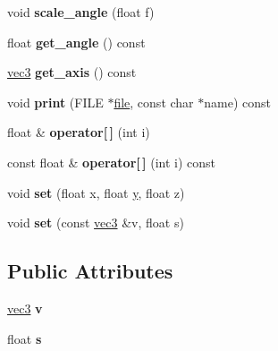 \begin{DoxyCompactItemize}
\item 
\hypertarget{classquat_a8861fff3cf3e4dbc76c472dd0605efd7}{void {\bfseries scale\+\_\+angle} (float f)}\label{classquat_a8861fff3cf3e4dbc76c472dd0605efd7}

\item 
\hypertarget{classquat_ad174ed3eb73c015ec1c64db57cafcfed}{float {\bfseries get\+\_\+angle} () const }\label{classquat_ad174ed3eb73c015ec1c64db57cafcfed}

\item 
\hypertarget{classquat_a4f4db727d50a5ab0c23b7ffeb7b4c57b}{\hyperlink{classvec3}{vec3} {\bfseries get\+\_\+axis} () const }\label{classquat_a4f4db727d50a5ab0c23b7ffeb7b4c57b}

\item 
\hypertarget{classquat_ac2dcca32b18337fa8e67f89b9b207108}{void {\bfseries print} (F\+I\+L\+E $\ast$\hyperlink{structfile}{file}, const char $\ast$name) const }\label{classquat_ac2dcca32b18337fa8e67f89b9b207108}

\item 
\hypertarget{classquat_acea2496f35b55cfb8a337695887441a6}{float \& {\bfseries operator\mbox{[}$\,$\mbox{]}} (int i)}\label{classquat_acea2496f35b55cfb8a337695887441a6}

\item 
\hypertarget{classquat_a45b8d8b7bb3b40ec22f8735c1f91c678}{const float \& {\bfseries operator\mbox{[}$\,$\mbox{]}} (int i) const }\label{classquat_a45b8d8b7bb3b40ec22f8735c1f91c678}

\item 
\hypertarget{classquat_a8e2e0b7557155d3ec789847cc6cc9404}{void {\bfseries set} (float x, float \hyperlink{_ice_utils_8h_aa7ffaed69623192258fb8679569ff9ba}{y}, float z)}\label{classquat_a8e2e0b7557155d3ec789847cc6cc9404}

\item 
\hypertarget{classquat_a7a82f8b8a507699a54aaf57dabd89da9}{void {\bfseries set} (const \hyperlink{classvec3}{vec3} \&v, float s)}\label{classquat_a7a82f8b8a507699a54aaf57dabd89da9}

\end{DoxyCompactItemize}
\subsection*{Public Attributes}
\begin{DoxyCompactItemize}
\item 
\hypertarget{classquat_a2448ee0f87a5493b1765f1991d844f57}{\hyperlink{classvec3}{vec3} {\bfseries v}}\label{classquat_a2448ee0f87a5493b1765f1991d844f57}

\item 
\hypertarget{classquat_aca7e4a2b5505ba75ec3f493cfccc98a2}{float {\bfseries s}}\label{classquat_aca7e4a2b5505ba75ec3f493cfccc98a2}

\end{DoxyCompactItemize}
